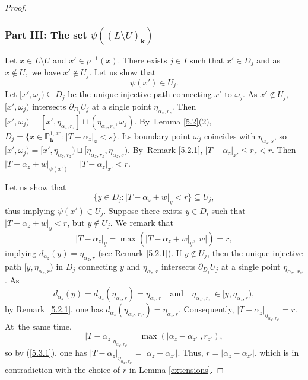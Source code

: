 \documentclass[JEP,XML,SOM,Unicode,NoFloatCountersInSection,published]{cedram}
\newcommand{\quand}{\quad\text{and}\quad}
\newcommand{\bbk}{{\boldsymbol{k}}}%
\let\backslash\setminus
\theoremstyle{definition}
\begin{document}
\begin{proof}
\subsubsection*{Part III: The set $\psi((L \backslash U)_{\bbk})$}
Let $x \in L \backslash U$ and $x' \in p^{-1}(x)$. There exists $j \in I$ such that $x' \in D_j$ and as $x \notin U, $ we have $x' \notin U_j$. Let us show that
\begin{equation} \label{5.5}
\psi(x') \in U_j.
\end{equation}
Let $[x', \omega_j) \subseteq D_j$ be the unique injective path connecting $x'$ to $\omega_j$. As $x' \notin U_j$, $[x', \omega_j)$ intersects $\partial_{D_j} U_j$ at a single point $\eta_{\alpha_z, r_z}$. Then $[x', \omega_j)=[x', \eta_{\alpha_{z}, r_z}] \sqcup (\eta_{\alpha_z, r_z}, \omega_j)$.
By~Lemma \ref{5.2}(2),
$D_j=\{x \in \mathbb{P}_{\bbk}^{1, \mathrm{an}}: |T-\alpha_z|_x <s\}$. Its boundary point $\omega_j$ coincides with $\eta_{\alpha_z, s}$, so $[x', \omega_j)=[x', \eta_{\alpha_z, r_z}) \sqcup [\eta_{\alpha_z, r_z}, \eta_{\alpha_z,s})$. By~Remark \ref{5.2.1}, $|T-\alpha_z|_{x'} \leqslant r_z <r$. Then
$|T-\alpha_z+w|_{\psi(x')}=|T-\alpha_z|_{x'} < r$.

Let us show that
\[
\{y \in D_{j}:|T-\alpha_z+w|_y < r\} \subseteq U_{j},
\]
thus implying $\psi(x') \in U_j$.
Suppose there exists $y \in D_i$ such that $|T-\alpha_z+w|_y < r$, but $y \notin U_j$.
We remark that
\[
|T-\alpha_z|_y=\max(|T-\alpha_z+w|_y, |w|)=r,
\]
implying $d_{\alpha_z}(y)=\eta_{\alpha_z, r}$ (see Remark \ref{5.2.1}). If ${y \notin U_j}$, then the unique injective path $[y, \eta_{\alpha_z, r})$ in $D_j$ connecting $y$ and $\eta_{\alpha_z,r}$ intersects $\partial_{D_j}U_j$ at a single point $\eta_{\alpha_{z'}, r_{z'}}$. As
\[
{d_{\alpha_z}(y)=d_{\alpha_z}(\eta_{\alpha_{z},r})=\eta_{\alpha_z, r}}\quand\eta_{\alpha_{z'}, r_{z'}} \in [y, \eta_{\alpha_z, r}),
\]
by Remark~\ref{5.2.1}, one has $d_{\alpha_z}(\eta_{\alpha_{z'}, r_{z'}})\!=\!\eta_{\alpha_z, r}$. Consequently, $|T-\alpha_z|_{\eta_{\alpha_{z'}, r_{z'}}}\!=\!r$. At~the same time,
\[
|T-\alpha_z|_{\eta_{\alpha_{z'}, r_{z'}}}=\max(|\alpha_z-\alpha_{z'}|,r_{z'}),
\]
so by (\ref{5.3.1}), one has $|T-\alpha_z|_{\eta_{\alpha_{z'}, r_{z'}}}=|\alpha_z-\alpha_{z'}|$. Thus, $r=|\alpha_z-\alpha_{z'}|$, which is in contradiction with the choice of $r$ in Lemma \ref{extensions}.


\end{proof}
\end{document}

